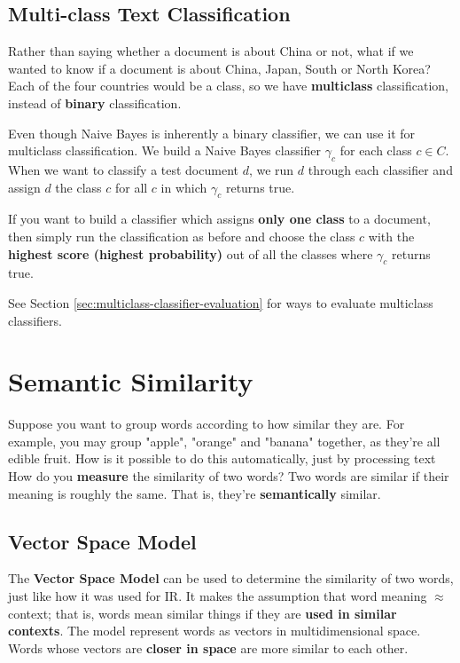 \documentclass{article}
\begin{document}
\subsection{Multi-class Text Classification}

Rather than saying whether a document is about China or not, what if we wanted to know if a document is about China, Japan, South or North Korea? Each of the four countries would be a class, so we have \textbf{multiclass} classification, instead of \textbf{binary} classification.

Even though Naive Bayes is inherently a binary classifier, we can use it for multiclass classification. We build a Naive Bayes classifier $\gamma_c$ for each class $c \in C$. When we want to classify a test document $d$, we run $d$ through each classifier and assign $d$ the class $c$ for all $c$ in which $\gamma_c$ returns true.

If you want to build a classifier which assigns \textbf{only one class} to a document, then simply run the classification as before and choose the class $c$ with the \textbf{highest score (highest probability)} out of all the classes where $\gamma_c$ returns true.

See Section \ref{sec:multiclass-classifier-evaluation} for ways to evaluate multiclass classifiers.

\section{Semantic Similarity}

Suppose you want to group words according to how similar they are. For example, you may group "apple", "orange" and "banana" together, as they're all edible fruit. How is it possible to do this automatically, just by processing text How do you \textbf{measure} the similarity of two words? Two words are similar if their meaning is roughly the same. That is, they're \textbf{semantically} similar.

\subsection{Vector Space Model}

The \textbf{Vector Space Model} can be used to determine the similarity of two words, just like how it was used for IR. It makes the assumption that word meaning $\approx$ context; that is, words mean similar things if they are \textbf{used in similar contexts}. The model represent words as vectors in multidimensional space. Words whose vectors are \textbf{closer in space} are more similar to each other.
\end{document}
